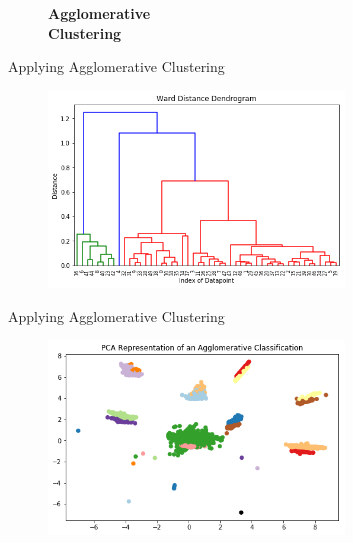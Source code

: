\documentclass[10pt,xcolor={table,dvipsnames},t]{beamer}
\begin{document}
\begin{frame}
\begin{figure}
\vspace*{9em}
    \Huge \textbf{Agglomerative} \\
    \Huge \textbf{Clustering}
    \hline
\vspace*{\fill}
\end{figure}
\end{frame}

\begin{frame}{Applying Agglomerative Clustering}
\begin{figure}
\begin{center}
    \includegraphics[width=0.7\textwidth]{images/dendrogram.png}
\end{center}
\end{figure}
\end{frame}

\begin{frame}{Applying Agglomerative Clustering}
\begin{figure}
\begin{center}
    \includegraphics[width=0.7\textwidth]{images/agglomerative_pca.png}
\end{center}
\end{figure}
\end{frame}
\end{document}
